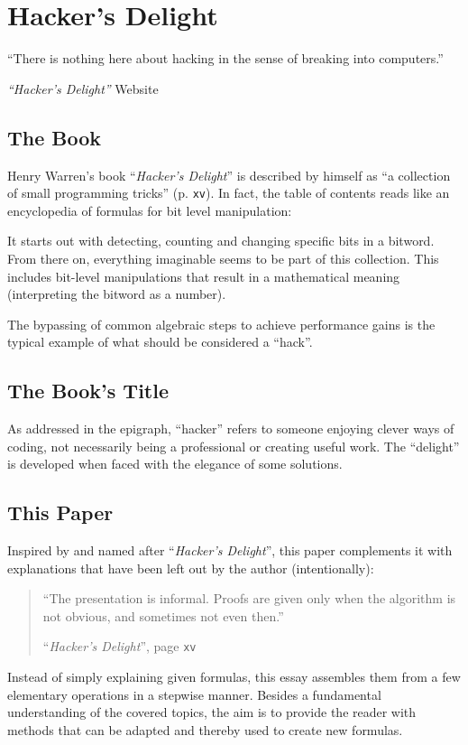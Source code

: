 \section{Hacker's Delight}\label{sec:book}
\epigraph{
``There is nothing here about hacking
in the sense of breaking into computers.''
}{
\emph{``Hacker's Delight''} Website
\cite{Warren:HD:Website}
}


\subsection*{The Book}
Henry Warren's book ``\emph{Hacker's Delight}''
is described by himself as
``a collection of small programming tricks''
\cite{Warren:2012:HD:2462741} (p. \texttt{xv}).
In fact, the table of contents reads like
an encyclopedia of formulas for bit level manipulation:

It starts out with detecting, counting and changing
specific bits in a bitword.
From there on, everything imaginable seems to be part of this collection.
This includes bit-level manipulations that result
in a mathematical meaning (interpreting the bitword as a number).

The bypassing of common algebraic steps
to achieve performance gains is the typical example
of what should be considered a ``hack''.


\subsection*{The Book's Title}
As addressed in the epigraph, ``hacker'' refers to
someone enjoying clever ways of coding,
not necessarily being a professional
or creating useful work.
The ``delight'' is developed when faced with the elegance of some solutions.


\subsection*{This Paper}
Inspired by and named after ``\emph{Hacker's Delight}'',
this paper complements it with explanations
that have been left out by the author (intentionally):

\begin{quote}
``The presentation is informal.
Proofs are given only when the algorithm is not obvious,
and sometimes not even then.''
\par\hfill ``\emph{Hacker's Delight}'',
page \texttt{xv} \cite{Warren:2012:HD:2462741}
\end{quote}

Instead of simply explaining given formulas,
this essay assembles them from a few elementary operations
in a stepwise manner.
Besides a fundamental understanding of the covered topics,
the aim is to provide the reader with methods
that can be adapted and thereby used to create new formulas.
